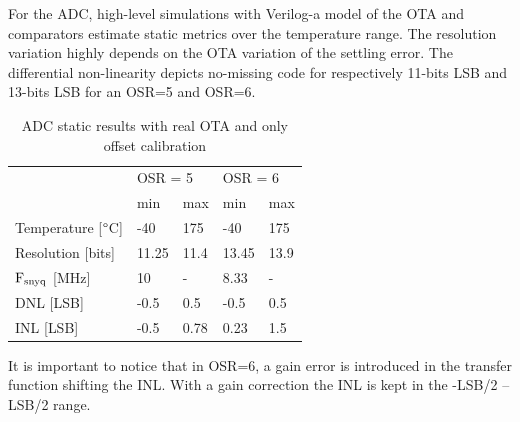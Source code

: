 For the ADC, high-level simulations with Verilog-a model of the OTA and comparators estimate static metrics over the temperature range. The resolution variation highly depends on the OTA variation of the settling error. The differential non-linearity depicts no-missing code for respectively 11-bits LSB and 13-bits LSB for an OSR=5 and OSR=6.

\begin{table}[htp]
	\centering
	\caption{ADC static results with real OTA and only offset calibration}
	\begin{tabular}{@{}lllll@{}}
	\toprule
	 & \multicolumn{2}{l}{OSR = 5} & \multicolumn{2}{l}{OSR = 6} \\
	 & min & max & min & max \\ \midrule
	Temperature {[}$\degree$C{]} & -40 & 175 & -40 & 175 \\
	Resolution {[}bits{]} & 11.25 & 11.4 & 13.45 & 13.9 \\
	$\rm F_{snyq}$ {[}MHz{]} & 10 & - & 8.33 & - \\
	DNL {[}LSB{]} & -0.5 & 0.5 & -0.5 & 0.5 \\
	INL {[}LSB{]} & -0.5 & 0.78 & 0.23 & 1.5 \\ \bottomrule
	\end{tabular}
\end{table}

It is important to notice that in OSR=6, a gain error is introduced in the transfer function shifting the INL. With a gain correction the INL is kept in the -LSB/2 -- LSB/2 range.